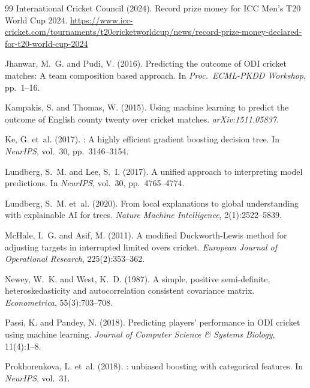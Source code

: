 \documentclass[10pt,a4paper,twocolumn]{article}
\begin{document}
\begin{thebibliography}{99}
International Cricket Council (2024).
\newblock Record prize money for ICC Men's T20 World Cup 2024.
\newblock \url{https://www.icc-cricket.com/tournaments/t20cricketworldcup/news/record-prize-money-declared-for-t20-world-cup-2024}

Jhanwar, M.~G. and Pudi, V. (2016).
\newblock Predicting the outcome of ODI cricket matches: A team composition based approach.
\newblock In \emph{Proc.\ ECML-PKDD Workshop}, pp.~1--16.

Kampakis, S. and Thomas, W. (2015).
\newblock Using machine learning to predict the outcome of English county twenty over cricket matches.
\newblock \emph{arXiv:1511.05837}.

Ke, G. et~al. (2017).
: A highly efficient gradient boosting decision tree.
\newblock In \emph{NeurIPS}, vol.~30, pp.~3146--3154.

Lundberg, S.~M. and Lee, S.~I. (2017).
\newblock A unified approach to interpreting model predictions.
\newblock In \emph{NeurIPS}, vol.~30, pp.~4765--4774.

Lundberg, S.~M. et~al. (2020).
\newblock From local explanations to global understanding with explainable AI for trees.
\newblock \emph{Nature Machine Intelligence}, 2(1):2522--5839.

McHale, I.~G. and Asif, M. (2011).
\newblock A modified Duckworth-Lewis method for adjusting targets in interrupted limited overs cricket.
\newblock \emph{European Journal of Operational Research}, 225(2):353--362.

Newey, W.~K. and West, K.~D. (1987).
\newblock A simple, positive semi-definite, heteroskedasticity and autocorrelation consistent covariance matrix.
\newblock \emph{Econometrica}, 55(3):703--708.

Passi, K. and Pandey, N. (2018).
\newblock Predicting players' performance in ODI cricket using machine learning.
\newblock \emph{Journal of Computer Science \& Systems Biology}, 11(4):1--8.

Prokhorenkova, L. et~al. (2018).
: unbiased boosting with categorical features.
\newblock In \emph{NeurIPS}, vol.~31.


\end{thebibliography}
\end{document}
